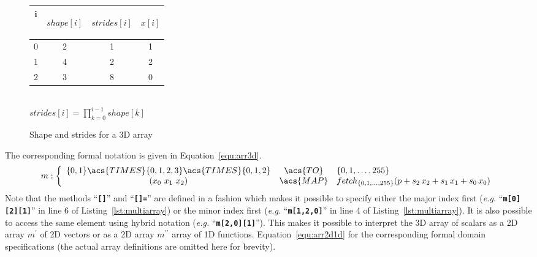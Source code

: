 \documentclass[12pt,a4paper,oneside,openright]{book}
\newcommand{\eg}{\emph{e.g.} }
\newcommand{\equ}[1]{Equation~\ref{equ:#1}}
\newcommand{\lst}[1]{Listing~\ref{lst:#1}}
\newcommand{\removed}[1]{\cbstart\removedfragile{#1}\cbend{}}
\newcommand{\removedfragile}[1]{{\color{red}{\sout{#1}}}{}}
\newcommand{\added}[1]{\cbstart\addedfragile{#1}\cbend{}}
\newcommand{\addedfragile}[1]{{\color{green!50!black}{\uline{#1}}}{}}
\newcommand{\removed}[1]{}
\newcommand{\removedfragile}[1]{}
\newcommand{\added}[1]{#1}
\newcommand{\addedfragile}[1]{#1}
\newcommand{\changed}[2]{\removed{#1}\added{#2}}
\newcommand{\code}[1]{``\texttt{\textbf{\textcolor{codegray}{\small{#1}}}}''}
\begin{document}
\begin{CJK}{UTF8}{}
\begin{figure}[t]
\begin{center}
\begin{minipage}[c]{.22\textwidth}
\begin{center}
        \begin{tabular}{cccc}\toprule
          i &
          \begin{sideways}$shape[i]$\end{sideways} &
          \begin{sideways}$strides[i]$\end{sideways} & 
          \begin{sideways}$x[i]$\end{sideways}\\\midrule
          0 & 2        & 1         & 1\\
          1 & 4        & 2         & 2\\
          2 & 3        & 8         & 0\\\bottomrule
        \end{tabular}\smallskip\\
        $strides[i]=\displaystyle\prod_{k=0}^{i-1}{shape[k]}$
      \end{center}
    \end{minipage}
    \begin{minipage}[c]{.28\textwidth}
    \end{minipage}
    \caption{Shape and strides for a \acs{3D} array\label{fig:shape}}
  \end{center}
\end{figure}
The corresponding formal notation is given in \equ{arr3d}.
\begin{equation}\label{equ:arr3d}
  m:\left\{\begin{array}{ccl}\{0,1\}\acs{TIMES}\{0,1,2,3\}\acs{TIMES}\{0,1,2\}&\acs{TO}&\{0,1,\ldots,255\}\\(x_0\ x_1\ x_2)&\acs{MAP}&fetch_{\{0,1,\ldots,255\}}(p+s_2\,x_2+s_1\,x_1+s_0\,x_0)\end{array}\right.
\end{equation}
Note that the methods \code{[]} and \code{[]=} are defined in a fashion which makes it possible to specify either the major index first (\eg \code{m[0][2][1]} in line 6 of \lst{multiarray}) or the minor index first (\eg \code{m[1,2,0]} in line 4 of \lst{multiarray}). It is also possible to access the same element using hybrid notation (\eg \code{m[2,0][1]}). This makes it possible to interpret the \ac{3D} array of scalars as a \ac{2D} array $m^\prime$ of \ac{2D} vectors or as a \ac{2D} array $m^{\prime\prime}$ array of \ac{1D} functions. \changed{Ssee}{See} \equ{arr2d1d} for the corresponding formal domain specifications (the actual array definitions are omitted here for brevity).

\end{CJK}
\end{document}
